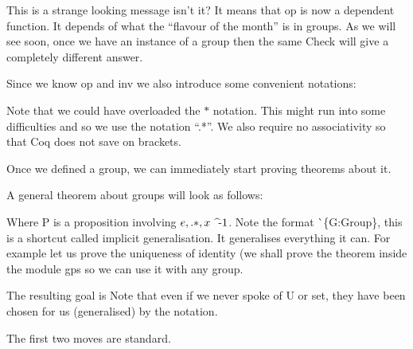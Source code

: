 This is a strange looking message isn't it? It means that op is now a dependent function. It depends of what the ``flavour of the month'' is in groups. As we will see soon, once we have an instance of a group then the same Check will give a completely different answer.

Since we know op and inv we  also introduce some convenient notations:

Note that we could have overloaded the $*$ notation. This might run into some difficulties and so we use the notation ``.*''. We also require no associativity so that Coq does not save on brackets.

Once we defined a group, we can immediately start proving theorems about it.

A general theorem about groups will look as follows:

Where P is a proposition involving $e, .*, x\inv $. Note the format \`{}\{G:Group\}, this is a shortcut called implicit generalisation. It generalises everything it can. For example let us prove the uniqueness of identity (we shall prove the theorem inside the module gps so we can use it with any group.



The resulting goal is 
Note that even if we never spoke of U or set, they have been chosen for us (generalised) by the notation. 


The first two moves are standard.

